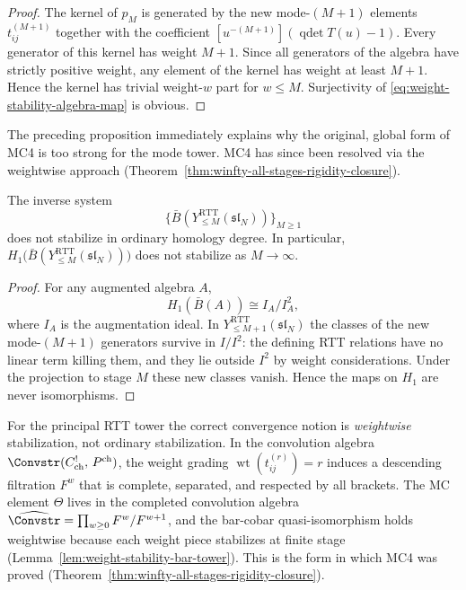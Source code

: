 \begin{proof}
The kernel of $p_M$ is generated by the new mode-$(M+1)$ elements
$t^{(M+1)}_{ij}$ together with the coefficient
$[u^{-(M+1)}](\operatorname{qdet}T(u)-1)$. Every generator of this kernel
has weight $M+1$. Since all generators of the algebra have strictly
positive weight, any element of the kernel has weight at least $M+1$.
Hence the kernel has trivial weight-$w$ part for $w\le M$. Surjectivity
of \eqref{eq:weight-stability-algebra-map} is obvious.
\end{proof}

The preceding proposition immediately explains why the original, global
form of MC4 is too strong for the mode tower. MC4 has since been
resolved via the weightwise approach
(Theorem~\ref{thm:winfty-all-stages-rigidity-closure}).

\begin{proposition}
\ClaimStatusProvedHere
\label{prop:failure-unweighted-stabilization}
The inverse system
\begin{equation}
\{\bar B(Y^{\mathrm{RTT}}_{\le M}(\mathfrak{sl}_N))\}_{M\ge 1}
\end{equation}
does not stabilize in ordinary homology degree. In particular,
$H_1\big(\bar B(Y^{\mathrm{RTT}}_{\le M}(\mathfrak{sl}_N))\big)$ does not
stabilize as $M\to\infty$.
\end{proposition}

\begin{proof}
For any augmented algebra $A$,
\begin{equation}
H_1(\bar B(A))\cong I_A/I_A^2,
\end{equation}
where $I_A$ is the augmentation ideal. In
$Y^{\mathrm{RTT}}_{\le M+1}(\mathfrak{sl}_N)$ the classes of the new
mode-$(M+1)$ generators survive in $I/I^2$: the defining RTT relations
have no linear term killing them, and they lie outside $I^2$ by weight
considerations. Under the projection to stage $M$ these new classes
vanish. Hence the maps on $H_1$ are never isomorphisms.
\end{proof}

\begin{remark}
\label{rem:correct-form-of-MC4}
For the principal RTT tower the correct convergence notion is
\emph{weightwise} stabilization, not ordinary stabilization.
In the convolution algebra $\Convstr(C^!_{\mathrm{ch}},\,
P^{\mathrm{ch}})$, the weight grading $\operatorname{wt}(t^{(r)}_{ij})
= r$ induces a descending filtration $F^w$ that is complete,
separated, and respected by all brackets. The MC element $\Theta$
lives in the completed convolution algebra
$\widehat{\Convstr} = \prod_{w \ge 0} F^w / F^{w+1}$, and the
bar-cobar quasi-isomorphism holds weightwise because each weight
piece stabilizes at finite stage (Lemma~\ref{lem:weight-stability-bar-tower}).
This is the form in which MC4 was proved
(Theorem~\ref{thm:winfty-all-stages-rigidity-closure}).
\end{remark}

